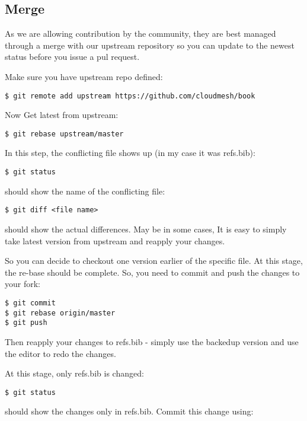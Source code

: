 \subsection{Merge}

As we are allowing contribution by the community, they are best managed
through a merge with our upstream repository so you can update to the
newest status before you issue a pul request.

Make sure you have upstream repo defined:

\begin{verbatim}
$ git remote add upstream https://github.com/cloudmesh/book
\end{verbatim}

Now Get latest from upstream:

\begin{verbatim}
$ git rebase upstream/master
\end{verbatim}

In this step, the conflicting file shows up (in my case it was
refs.bib):

\begin{verbatim}
$ git status
\end{verbatim}

should show the name of the conflicting file:

\begin{verbatim}
$ git diff <file name>
\end{verbatim}

should show the actual differences. May be in some cases, It is easy to
simply take latest version from upstream and reapply your changes.

So you can decide to checkout one version earlier of the specific file.
At this stage, the re-base should be complete. So, you need to commit
and push the changes to your fork:

\begin{verbatim}
$ git commit
$ git rebase origin/master
$ git push
\end{verbatim}

Then reapply your changes to refs.bib - simply use the backedup version
and use the editor to redo the changes.

At this stage, only refs.bib is changed:

\begin{verbatim}
$ git status
\end{verbatim}

should show the changes only in refs.bib. Commit this change using:

